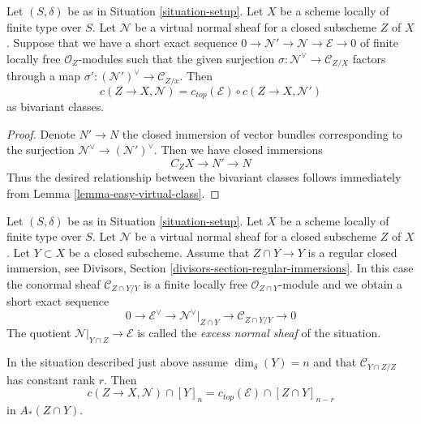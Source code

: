 \begin{lemma}
\label{lemma-gysin-decompose}
Let $(S, \delta)$ be as in Situation \ref{situation-setup}. Let $X$ be a scheme
locally of finite type over $S$. Let $\mathcal{N}$ be a virtual normal
sheaf for a closed subscheme $Z$ of $X$. Suppose that we have a short
exact sequence $0 \to \mathcal{N}' \to \mathcal{N} \to \mathcal{E} \to 0$
of finite locally free $\mathcal{O}_Z$-modules such that the given surjection
$\sigma : \mathcal{N}^\vee \to \mathcal{C}_{Z/X}$ factors through a map
$\sigma' : (\mathcal{N}')^\vee \to \mathcal{C}_{Z/x}$.
Then
$$
c(Z \to X, \mathcal{N}) = c_{top}(\mathcal{E}) \circ c(Z \to X, \mathcal{N}')
$$
as bivariant classes.
\end{lemma}

\begin{proof}
Denote $N' \to N$ the closed immersion of vector bundles corresponding
to the surjection $\mathcal{N}^\vee \to (\mathcal{N}')^\vee$. Then we
have closed immersions
$$
C_ZX \to N' \to N
$$
Thus the desired relationship between the bivariant classes follows
immediately from Lemma \ref{lemma-easy-virtual-class}.
\end{proof}

\noindent
Let $(S, \delta)$ be as in Situation \ref{situation-setup}. Let $X$ be a scheme
locally of finite type over $S$. Let $\mathcal{N}$ be a virtual normal
sheaf for a closed subscheme $Z$ of $X$. Let $Y \subset X$ be a closed
subscheme. Assume that $Z \cap Y \to Y$ is a regular closed immersion, see
Divisors, Section \ref{divisors-section-regular-immersions}.
In this case the conormal sheaf $\mathcal{C}_{Z \cap Y/Y}$ is a finite
locally free $\mathcal{O}_{Z \cap Y}$-module and we obtain a short
exact sequence
$$
0 \to \mathcal{E}^\vee \to
\mathcal{N}^\vee|_{Z \cap Y} \to \mathcal{C}_{Z \cap Y/Y} \to 0
$$
The quotient $\mathcal{N}|_{Y \cap Z} \to \mathcal{E}$ is called the
{\it excess normal sheaf} of the situation.

\begin{lemma}
\label{lemma-gysin-fundamental}
In the situation described just above assume $\dim_\delta(Y) = n$
and that $\mathcal{C}_{Y \cap Z/Z}$ has constant rank $r$.
Then
$$
c(Z \to X, \mathcal{N}) \cap [Y]_n =
c_{top}(\mathcal{E}) \cap [Z \cap Y]_{n - r}
$$
in $A_*(Z \cap Y)$.
\end{lemma}

